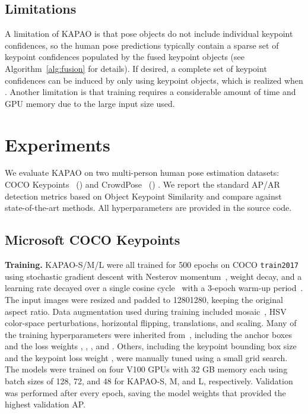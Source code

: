 \documentclass[runningheads]{llncs}
\newcommand\hlll[1]{\bgroup
  \hskip0pt\color{black}#1\egroup
}
\begin{document}
\subsection{Limitations}
\label{sec:kapao_limitations}
A limitation of KAPAO is that pose objects do not include individual keypoint confidences, so the human pose predictions typically contain a sparse set of keypoint confidences  populated by the fused keypoint objects (see Algorithm~\ref{alg:fusion} for details). If desired, a complete set of keypoint confidences can be induced by only using keypoint objects, which is realized when . Another limitation is that training requires a considerable amount of time and GPU memory due to the large input size used. 

\section{Experiments}
\label{sec:kapao_exp}
We evaluate KAPAO on two multi-person human pose estimation datasets: COCO Keypoints~\cite{lin2014microsoft} \hlll{()} and CrowdPose~\cite{li2019crowdpose} \hlll{()}. We report the standard AP/AR detection metrics based on Object Keypoint Similarity \cite{lin2014microsoft} and compare against state-of-the-art methods.
All hyperparameters are provided in the source code.

\subsection{Microsoft COCO Keypoints}
\medskip\noindent\textbf{Training.} KAPAO-S/M/L were all trained for 500 epochs on COCO \texttt{train2017} using stochastic gradient descent with Nesterov momentum~\cite{Nesterov1983AMF}, weight decay, and a learning rate decayed over a single cosine cycle~\cite{loshchilov2016sgdr} with a 3-epoch warm-up period~\cite{goyal2017accurate}. The input images were resized and padded to 12801280, keeping the original aspect ratio. Data augmentation used during training included mosaic~\cite{bochkovskiy2020yolov4}, HSV color-space perturbations, horizontal flipping, translations, and scaling. Many of the training hyperparameters were inherited from~\cite{wang2020scaled, glenn_jocher_2021_4679653}, including the anchor boxes  and the loss weights , , , and . Others, including the keypoint bounding box size  and the keypoint loss weight , were manually tuned using a small grid search. The models were trained on four V100 GPUs with 32 GB memory each using batch sizes of 128, 72, and 48 for KAPAO-S, M, and L, respectively. Validation was performed after every epoch, saving the model weights that provided the highest validation AP.
\end{document}
